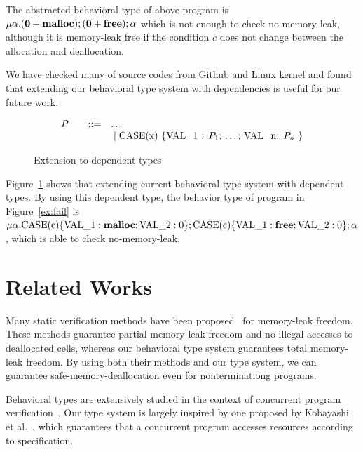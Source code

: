 \documentclass{sigplanconf}
\begin{document}
The abstracted behavioral type of above program is
\(\mu\alpha. (\mathbf{0} + \mathbf{malloc}); (\mathbf{0} + \mathbf{free}); \alpha\)
which is not enough to check no-memory-leak, although it is
memory-leak free if the condition \(c\) does not change between the
allocation and deallocation.

We have checked many of source codes from Github and Linux kernel and
found that extending our behavioral type system with dependencies is
useful for our future work.

\begin{figure}[h]
  \[
  \begin{array}{rlcl}
  P &  &::=& \ldots \\
  & & &\;|\; \mbox{CASE(x) \{VAL\_1 : $P_1$; \ldots ; VAL\_n: $P_n$  \}}\\
\end{array}
\]
\caption{Extension to dependent types}
\label{ex:beh}
\end{figure}

Figure~\ref{ex:beh} shows that extending current behavioral type
system with dependent types. By using this dependent type, the
behavior type of program in Figure~\ref{ex:fail} is
\(\mu\alpha. \mbox{CASE(c)} \{ \mbox{VAL\_1} : \mathbf{malloc}; \mbox{VAL\_2}:
0 \}; \mbox{CASE(c)}\{ \mbox{VAL\_1} : \mathbf{free}; \mbox{VAL\_2}: 0 \};
\alpha\), which is able to check no-memory-leak.

\section{Related Works}
Many static verification methods have been
proposed~\cite{DBLP:conf/aplas/SuenagaK09,DBLP:conf/pldi/HeineL03,DBLP:conf/sigsoft/XieA05,DBLP:journals/scp/SwamyHMGJ06,DBLP:conf/sas/OrlovichR06,DBLP:conf/issta/SuiYX12}
for memory-leak freedom. These methods guarantee partial memory-leak
freedom and no illegal accesses to deallocated cells, whereas our
behavioral type system guarantees total memory-leak freedom. By using
both their methods and our type system, we can guarantee
safe-memory-deallocation even for nonterminationg programs.

Behavioral types are extensively studied in the context of concurrent
program
verification~\cite{DBLP:conf/esop/HondaVK98,DBLP:journals/tcs/IgarashiK04,DBLP:conf/esop/VieiraCS08,DBLP:journals/lmcs/KobayashiSW06}.
Our type system is largely inspired by one proposed by Kobayashi et
al.~\cite{DBLP:journals/lmcs/KobayashiSW06}, which guarantees that a
concurrent program accesses resources according to specification.
\end{document}
